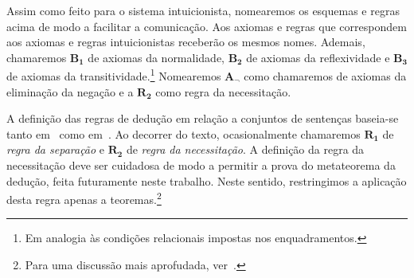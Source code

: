     Assim como feito para o sistema intuicionista, nomearemos os esquemas e regras acima de modo a facilitar a comunicação.
    Aos axiomas e regras que correspondem aos axiomas e regras intuicionistas receberão os mesmos nomes. Ademais, chamaremos $\mathbf{B_1}$ de axiomas da normalidade, $\mathbf{B_2}$ de axiomas da reflexividade e $\mathbf{B_3}$ de axiomas da transitividade.\footnote{Em analogia às condições relacionais impostas nos enquadramentos.} Nomearemos $\mathbf{A_\neg}$ como chamaremos de axiomas da eliminação da negação e a $\mathbf{R_2}$ como regra da necessitação.

    A definição das regras de dedução em relação a conjuntos de sentenças baseia-se tanto em~\cite{Troelstra} como em~\cite{Hakli}. Ao decorrer do texto, ocasionalmente chamaremos $\mathbf{R_1}$ de \emph{regra da separação} e $\mathbf{R_2}$ de \emph{regra da necessitação}. A definição da regra da necessitação deve ser cuidadosa de modo a permitir a prova do metateorema da dedução, feita futuramente neste trabalho. Neste sentido, restringimos a aplicação desta regra apenas a teoremas.\footnote{Para uma discussão mais aprofudada, ver~\cite{Hakli}.}
